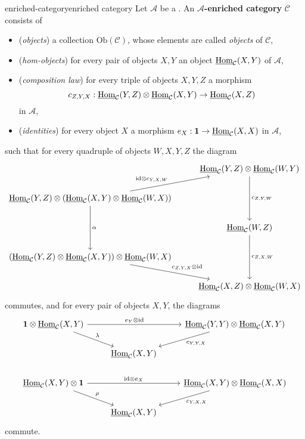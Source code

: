 \begin{topic}{enriched-category}{enriched category}
    Let $\mathcal{A}$ be a . An \textbf{$\mathcal{A}$-enriched category} $\mathcal{C}$ consists of
    \begin{itemize}
        \item (\textit{objects}) a collection $\text{Ob}(\mathcal{C})$, whose elements are called \textit{objects} of $\mathcal{C}$,
        \item (\textit{hom-objects}) for every pair of objects $X, Y$ an object $\underline{\text{Hom}}_\mathcal{C}(X, Y)$ of $\mathcal{A}$,
        \item (\textit{composition law}) for every triple of objects $X, Y, Z$ a morphism
        \[ c_{Z, Y, X} : \underline{\text{Hom}}_\mathcal{C}(Y, Z) \otimes \underline{\text{Hom}}_\mathcal{C}(X, Y) \to \underline{\text{Hom}}_\mathcal{C}(X, Z) \]
        in $\mathcal{A}$,
        \item (\textit{identities}) for every object $X$ a morphism $e_X : \textbf{1} \to \underline{\text{Hom}}_\mathcal{C}(X, X)$ in $\mathcal{A}$,
    \end{itemize}
    such that for every quadruple of objects $W, X, Y, Z$ the diagram
    \[ \begin{tikzcd}
        & \underline{\Hom}_\mathcal{C}(Y, Z) \otimes \underline{\Hom}_\mathcal{C}(W, Y) \arrow{dd}{c_{Z, Y, W}} \\ \underline{\Hom}_\mathcal{C}(Y, Z) \otimes \left(\underline{\Hom}_\mathcal{C}(X, Y) \otimes \underline{\Hom}_\mathcal{C}(W, X)\right) \arrow{ur}{\id \otimes c_{Y, X, W}} \arrow{dd}{\alpha} & \\ & \underline{\Hom}_\mathcal{C}(W, Z) \arrow{dd}{c_{Z, X, W}} \\ \left(\underline{\Hom}_\mathcal{C}(Y, Z) \otimes \underline{\Hom}_\mathcal{C}(X, Y)\right) \otimes \underline{\Hom}_\mathcal{C}(W, X) \arrow{dr}{c_{Z, Y, X} \otimes \id} & \\ & \underline{\Hom}_\mathcal{C}(X, Z) \otimes \underline{\Hom}_\mathcal{C}(W, X)
    \end{tikzcd} \]
    commutes, and for every pair of objects $X, Y$, the diagrams
    \[ \begin{tikzcd}
        \textbf{1} \otimes \underline{\Hom}_\mathcal{C}(X, Y) \arrow{rr}{e_Y \otimes \id} \arrow{dr}{\lambda} && \underline{\Hom}_\mathcal{C}(Y, Y) \otimes \underline{\Hom}_\mathcal{C}(X, Y) \arrow{dl}{c_{Y, Y, X}} \\ & \underline{\Hom}_\mathcal{C}(X, Y) & \\
        \underline{\Hom}_\mathcal{C}(X, Y) \otimes \textbf{1} \arrow{rr}{\id \otimes e_X} \arrow{dr}{\rho} && \underline{\Hom}_\mathcal{C}(X, Y) \otimes \underline{\Hom}_\mathcal{C}(X, X) \arrow{dl}{c_{Y, X, X}} \\ & \underline{\Hom}_\mathcal{C}(X, Y) &       
    \end{tikzcd} \]
    commute.
\end{topic}

